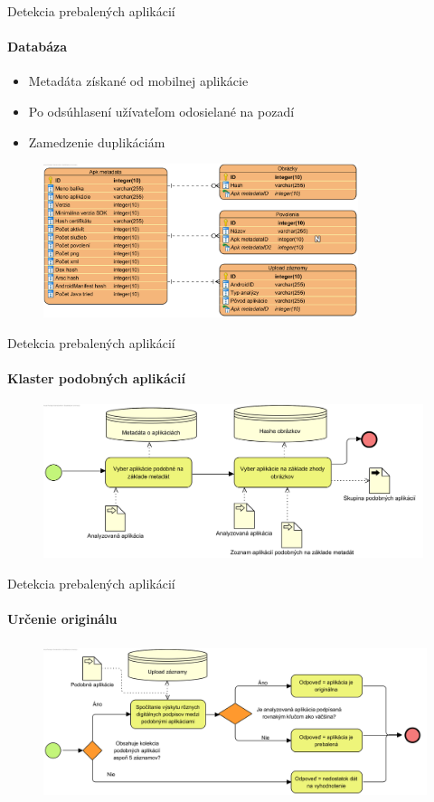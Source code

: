 \documentclass{beamer}
\begin{document}
  \begin{frame}[label=lists]{Detekcia prebalených aplikácií}
 	 \framesubtitle{Databáza}
		\begin{itemize}
			\item Metadáta získané od mobilnej aplikácie
			\item Po odsúhlasení užívateľom odosielané na pozadí
			\item Zamedzenie duplikáciám
		\end{itemize}
		\begin{figure}[htb]
	  	\begin{center}
    		\includegraphics[height=4.5cm]{images/detection-db-erd.png}
  		\end{center}
	\end{figure}
  \end{frame}   
  
  \begin{frame}[label=lists]{Detekcia prebalených aplikácií}
 	 \framesubtitle{Klaster podobných aplikácií}
		\begin{figure}[htb]
	  	\begin{center}
    		\includegraphics[height=4.5cm]{images/detection-cluster.png}
  		\end{center}
	\end{figure}
  \end{frame}   
  
  \begin{frame}[label=lists]{Detekcia prebalených aplikácií}
 	 \framesubtitle{Určenie originálu}
		\begin{figure}[htb]
	  	\begin{center}
    		\includegraphics[height=4.5cm]{images/detection-original.png}
  		\end{center}
	\end{figure}
  \end{frame}    
  
\end{document}
